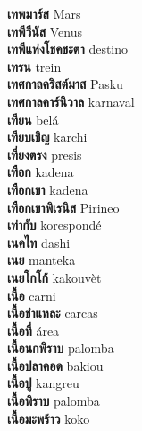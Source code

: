 \textbf{ เทพมาร์ส  } Mars \\
\textbf{ เทพีวีนัส  } Venus \\
\textbf{ เทพีแห่งโชคชะตา  } destino \\
\textbf{ เทรน  } trein \\
\textbf{ เทศกาลคริสต์มาส  } Pasku \\
\textbf{ เทศกาลคาร์นิวาล  } karnaval \\
\textbf{ เทียน  } belá \\
\textbf{ เทียบเชิญ  } karchi \\
\textbf{ เที่ยงตรง  } presis \\
\textbf{ เทือก  } kadena \\
\textbf{ เทือกเขา  } kadena \\
\textbf{ เทือกเขาพิเรนิส  } Pirineo \\
\textbf{ เท่ากับ  } korespondé \\
\textbf{ เนคไท  } dashi \\
\textbf{ เนย  } manteka \\
\textbf{ เนยโกโก้  } kakouvèt \\
\textbf{ เนื้อ  } carni \\
\textbf{ เนื้อชำแหละ  } carcas \\
\textbf{ เนื้อที่  } área \\
\textbf{ เนื้อนกพิราบ  } palomba \\
\textbf{ เนื้อปลาคอด  } bakiou \\
\textbf{ เนื้อปู  } kangreu \\
\textbf{ เนื้อพิราบ  } palomba \\
\textbf{ เนื้อมะพร้าว  } koko \\
